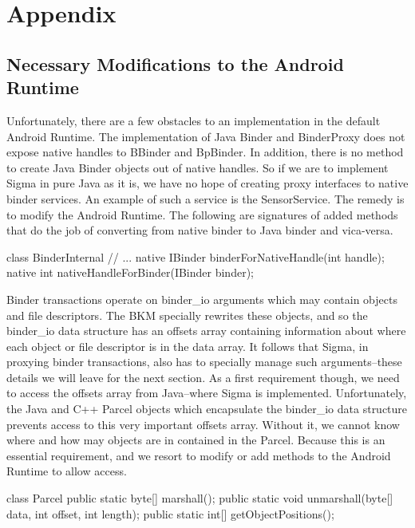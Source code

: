 \documentclass[prodmode]{acmlarge}
\begin{document}


\section{Appendix}

\subsection{Necessary Modifications to the Android Runtime}
\label{sec:AndroidRuntimeModifications}
Unfortunately, there are a few obstacles to an implementation in the default Android Runtime. The implementation of Java Binder and BinderProxy does not expose native handles to BBinder and BpBinder. In addition, there is no method to create Java Binder objects out of native handles. So if we are to implement Sigma in pure Java as it is, we have no hope of creating proxy interfaces to native binder services. An example of such a service is the SensorService. The remedy is to modify the Android Runtime. The following are signatures of added methods that do the job of converting from native binder to Java binder and vica-versa.

\begin{snippet}
class BinderInternal {
  // ...
  native IBinder binderForNativeHandle(int handle);
  native int nativeHandleForBinder(IBinder binder);
}
\end{snippet}

Binder transactions operate on binder\_io arguments which may contain objects and file descriptors. The BKM specially rewrites these objects, and so the binder\_io data structure has an offsets array containing information about where each object or file descriptor is in the data array. It follows that Sigma, in proxying binder transactions, also has to specially manage such arguments--these details we will leave for the next section. As a first requirement though, we need to access the offsets array from Java--where Sigma is implemented. Unfortunately, the Java and C++ Parcel objects which encapsulate the binder\_io data structure prevents access to this very important offsets array. Without it, we cannot know where and how may objects are in contained in the Parcel. Because this is an essential requirement, and we resort to modify or add methods to the Android Runtime to allow access.

\begin{snippet}
class Parcel {
  public static byte[] marshall();
  public static void unmarshall(byte[] data, int offset, int length);
  public static int[] getObjectPositions();
}
\end{snippet}
\end{document}
